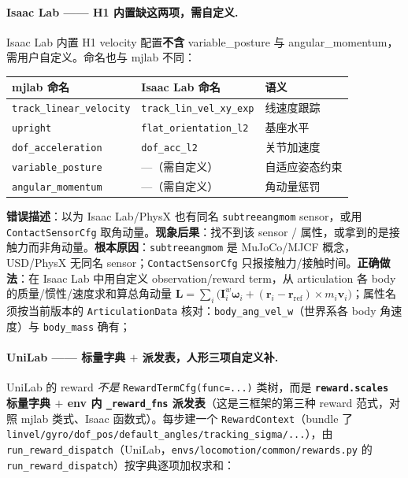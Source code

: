 \paragraph{Isaac Lab —— H1 内置缺这两项，需自定义.}
Isaac Lab 内置 H1 velocity 配置\textbf{不含} variable\_posture 与 angular\_momentum，需用户自定义。命名也与 mjlab 不同：

\begin{center}
\small
\begin{tabular}{lll}
\hline
mjlab 命名 & Isaac Lab 命名 & 语义 \\
\hline
\texttt{track\_linear\_velocity} & \texttt{track\_lin\_vel\_xy\_exp} & 线速度跟踪 \\
\texttt{upright} & \texttt{flat\_orientation\_l2} & 基座水平 \\
\texttt{dof\_acceleration} & \texttt{dof\_acc\_l2} & 关节加速度 \\
\texttt{variable\_posture} & ---（需自定义） & 自适应姿态约束 \\
\texttt{angular\_momentum} & ---（需自定义） & 角动量惩罚 \\
\hline
\end{tabular}
\end{center}

\begin{pitfall}
\textbf{错误描述}：以为 Isaac Lab/PhysX 也有同名 \texttt{subtreeangmom} sensor，或用 \texttt{ContactSensorCfg} 取角动量。\textbf{现象后果}：找不到该 sensor / 属性，或拿到的是接触力而非角动量。\textbf{根本原因}：\texttt{subtreeangmom} 是 MuJoCo/MJCF 概念，USD/PhysX 无同名 sensor；\texttt{ContactSensorCfg} 只报接触力/接触时间。\textbf{正确做法}：在 Isaac Lab 中用自定义 observation/reward term，从 articulation 各 body 的质量/惯性/速度求和算总角动量 $\mathbf{L}=\sum_i\big(\mathbf{I}_i^{w}\boldsymbol\omega_i+(\mathbf{r}_i-\mathbf{r}_{\mathrm{ref}})\times m_i\mathbf{v}_i\big)$；属性名须按当前版本的 \texttt{ArticulationData} 核对：\texttt{body\_ang\_vel\_w}（世界系各 body 角速度）与 \texttt{body\_mass} 确有；
\end{pitfall}

\paragraph{UniLab —— 标量字典 $+$ 派发表，人形三项自定义补.}
UniLab 的 reward \emph{不是} \texttt{RewardTermCfg(func=...)} 类树，而是 \textbf{\texttt{reward.scales} 标量字典 $+$ env 内 \texttt{\_reward\_fns} 派发表}（这是三框架的第三种 reward 范式，对照 mjlab 类式、Isaac 函数式）。每步建一个 \texttt{RewardContext}（bundle 了 \texttt{linvel/gyro/dof\_pos/default\_angles/tracking\_sigma/...}），由 \texttt{run\_reward\_dispatch}（UniLab，\texttt{envs/locomotion/common/rewards.py} 的 \texttt{run\_reward\_dispatch}）按字典逐项加权求和：

